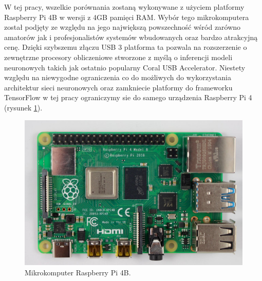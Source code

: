 W tej pracy, wszelkie porównania zostaną wykonywane z użyciem platformy Raspberry Pi 4B w wersji z 4GB pamięci RAM. Wybór tego mikrokomputera został podjęty ze względu na jego największą powszechność wśród zarówno amatorów jak i profesjonalistów systemów wbudowanych oraz bardzo atrakcyjną cenę. Dzięki szybszemu złączu USB 3 platforma ta pozwala na rozszerzenie o zewnętrzne procesory obliczeniowe stworzone z myślą o inferencji modeli neuronowych takich jak ostatnio popularny Coral USB Accelerator. Niestety  względu na niewygodne ograniczenia co do możliwych do wykorzystania architektur sieci neuronowych oraz zamkniecie platformy do frameworku TensorFlow w tej pracy ograniczymy sie do samego urządzenia Raspberry Pi 4 (rysunek \ref{fig:raspberry}).

\begin{figure}[h]
    \centering
    \includegraphics[width=0.8\linewidth]{img/rasberry.jpeg}
    \caption{Mikrokomputer Raspberry Pi 4B.}
    \label{fig:raspberry}
\end{figure}